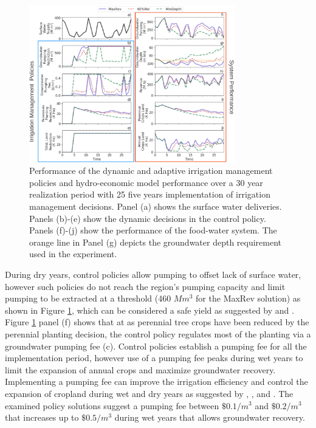 \documentclass[a4paper,fleqn]{cas-sc}
\begin{document}
\begin{figure}[htp!]
    \includegraphics[width=0.8\textwidth,center]{./figs/selected_highsd_performance.png}
    \caption{Performance of the dynamic and adaptive irrigation management policies and hydro-economic model performance over a 30 year realization period with 25 five years implementation of irrigation management decisions. Panel (a) shows the surface water deliveries. Panels (b)-(e) show the dynamic decisions in the control policy. Panels (f)-(j) show the performance of the food-water system. The orange line in Panel (g) depicts the groundwater depth requirement used in the experiment.} \label{fig:6}
\end{figure}

During dry years, control policies allow pumping to offset lack of surface water, however such policies do not reach the region’s pumping capacity and limit pumping to be extracted at a threshold (460 $M m^3$ for the MaxRev solution) as shown in Figure \ref{fig:6}, which can be considered a safe yield as suggested by \citet{miro_framework_2019} and \citet{macewan_hydroeconomic_2017}. Figure \ref{fig:6} panel (f) shows that at as perennial tree crops have been reduced by the perennial planting decision, the control policy regulates most of the planting via a groundwater pumping fee (c). Control policies establish a pumping fee for all the implementation period, however use of a pumping fee peaks during wet years to limit the expansion of annual crops and maximize groundwater recovery. Implementing a pumping fee can improve the irrigation efficiency and control the expansion of cropland during wet and dry years as suggested by \citet{stone_economic_2022}, \citet{graveline_combining_2020}, and \citet{khan_effect_2019}. The examined policy solutions suggest a pumping fee between $\$0.1/m^{3}$ and $\$0.2/m^{3}$ that increases up to $\$0.5/m^{3}$ during wet years that allows groundwater recovery.
\end{document}
